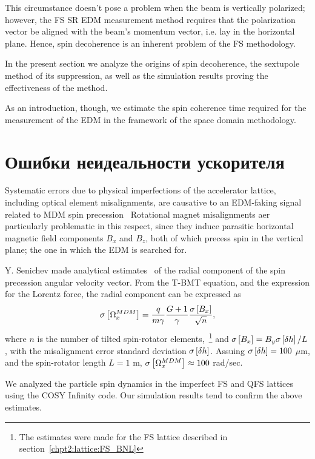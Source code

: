 This circumstance doesn't pose a problem when the beam is vertically polarized;
however, the FS SR EDM measurement method requires that the polarization vector be aligned with
the beam's momentum vector, i.e. lay in the horizontal plane. Hence, spin decoherence is an
inherent problem of the FS methodology.

In the present section we analyze the origins of spin decoherence,
the sextupole method of its suppression, as well as the simulation results
proving the effectiveness of the method.

As an introduction, though, we estimate the spin coherence time required for
the measurement of the EDM in the framework of the space domain methodology.



\section{Ошибки неидеальности ускорителя}\label{chpt3:imperfections}
Systematic errors due to physical imperfections of the accelerator lattice, including
optical element misalignments, are causative to an EDM-faking signal 
related to MDM spin precession~\cite[з.~230]{Eremey:Thesis} Rotational magnet misalignments 
aer particularly problematic in this respect, since they induce parasitic horizontal magnetic field
components $B_x$ and $B_z$, both of which precess spin in the vertical plane; the one in which
the EDM is searched for.

Y. Senichev made analytical estimates~\cite{Senichev:FDM}  of the radial component of
the spin precession angular velocity vector. From the T-BMT equation, and the expression for
the Lorentz force, the radial component can be expressed as 
\begin{equation}
\SD{\W_x^{MDM}} = \frac{q}{m\gamma}\frac{G+1}{\gamma}\frac{\SD{B_x}}{\sqrt{n}},
\end{equation}
where $n$ is the number of tilted spin-rotator elements,~\footnote{The estimates were made for
the FS lattice described in section~\ref{chpt2:lattice:FS_BNL}} and $\SD{B_x} = B_y \SD{\delta h}/L$, 
with the misalignment error standard deviation $\SD{\delta h}$. Assuing $\SD{\delta h} = 100$ $\mu$m, 
and the spin-rotator length $L=1$ m, $\SD{\W_x^{MDM}} \approx 100$ rad/sec.~\cite{Senichev:FDM}

We analyzed the particle spin dynamics in the imperfect FS and QFS lattices using the COSY Infinity code. 
Our simulation results tend to confirm the above estimates.

